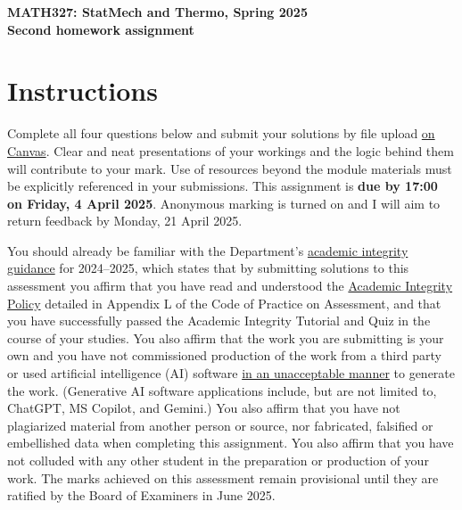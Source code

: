 \documentclass[12 pt]{article} %
\begin{document}
\newcommand{\thisweek}{MATH327 Homework 2}
\newcommand{\moddate}{Last modified 25 Mar.~2025}
\begin{center}
  {\Large \textbf{MATH327: StatMech and Thermo, Spring 2025}} \\[12 pt]
  {\Large \textbf{Second homework assignment}} \\[24 pt]
\end{center}

\section*{Instructions}
Complete all four questions below and submit your solutions by file upload \href{https://canvas.liverpool.ac.uk/courses/76365/assignments/297934}{on Canvas}.
Clear and neat presentations of your workings and the logic behind them will contribute to your mark.
Use of resources beyond the module materials must be explicitly referenced in your submissions.
This assignment is \textbf{due by 17:00 on Friday, 4 April 2025}.
Anonymous marking is turned on and I will aim to return feedback by Monday, 21 April 2025.

You should already be familiar with the Department's \href{https://canvas.liverpool.ac.uk/courses/76365/files/11992667}{academic integrity guidance} for 2024--2025, which states that by submitting solutions to this assessment you affirm that you have read and understood the \href{https://www.liverpool.ac.uk/media/livacuk/tqsd/code-of-practice-on-assessment/appendix_L_cop_assess.pdf}{Academic Integrity Policy} detailed in Appendix L of the Code of Practice on Assessment, and that you have successfully passed the Academic Integrity Tutorial and Quiz in the course of your studies.
You also affirm that the work you are submitting is your own and you have not commissioned production of the work from a third party or used artificial intelligence (AI) software \href{https://www.liverpool.ac.uk/media/livacuk/centre-for-innovation-in-education/digital-education/generative-ai-teach-learn-assess/guidance-on-the-use-of-generative-ai.pdf}{in an unacceptable manner} to generate the work.
(Generative AI software applications include, but are not limited to, ChatGPT, MS Copilot, and Gemini.)
You also affirm that you have not plagiarized material from another person or source, nor fabricated, falsified or embellished data when completing this assignment.
You also affirm that you have not colluded with any other student in the preparation or production of your work.
The marks achieved on this assessment remain provisional until they are ratified by the Board of Examiners in June 2025.
\end{document}
